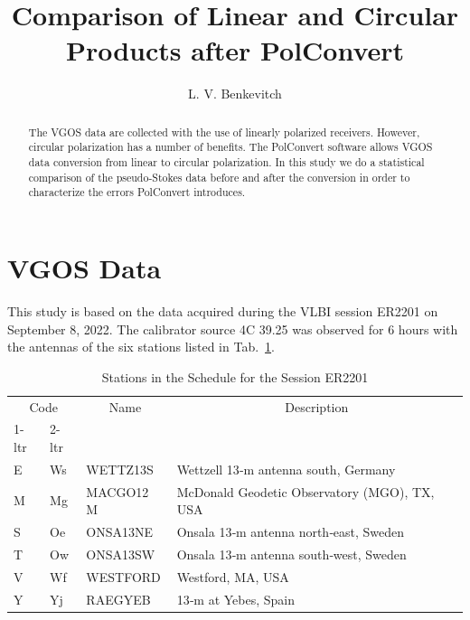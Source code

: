 \documentclass[letterpaper,twoside,12pt]{article}
\title{Comparison of Linear and Circular Products after PolConvert}
\author[1]{L. V. Benkevitch}
\affil[1]{\small MIT Haystack observatory, Westford, MA 01886, USA.}
\begin{document}
\maketitle

\begin{abstract}

The VGOS data are collected with the use of linearly polarized receivers. However, circular polarization has a number of benefits. The PolConvert software allows VGOS data conversion from linear to circular polarization. In this study we do a statistical comparison of the pseudo-Stokes data before and after the conversion in order to characterize the errors PolConvert introduces.

\end{abstract}


\tableofcontents

\section{VGOS Data}

This study is based on the data acquired during the VLBI session ER2201 on September 8, 2022. The calibrator source 4C 39.25 was observed for 6 hours with the antennas of the six stations listed in Tab.~\ref{stations}.

\begin{table}[ht!]
  \begin{center}
    \caption{Stations in the Schedule for the Session ER2201}
    \label{stations}
    \begin{tabular}{l|l|l|l}
    \multicolumn{2}{c|}{Code} & \multicolumn{1}{c|}{Name} & \multicolumn{1}{c}{Description} \\                       %
     1-ltr & 2-ltr &  &  \\
      \hline
E & Ws & WETTZ13S  & Wettzell 13‐m antenna south, Germany \\
M & Mg & MACGO12 M & McDonald Geodetic Observatory (MGO), TX, USA \\
S & Oe & ONSA13NE  & Onsala 13‐m antenna north‐east, Sweden \\
T & Ow & ONSA13SW  & Onsala 13‐m antenna south‐west, Sweden \\
V & Wf & WESTFORD  & Westford, MA, USA \\
Y & Yj & RAEGYEB   & 13‐m at Yebes, Spain
    \end{tabular}
  \end{center}
\end{table}
  
\end{document}
